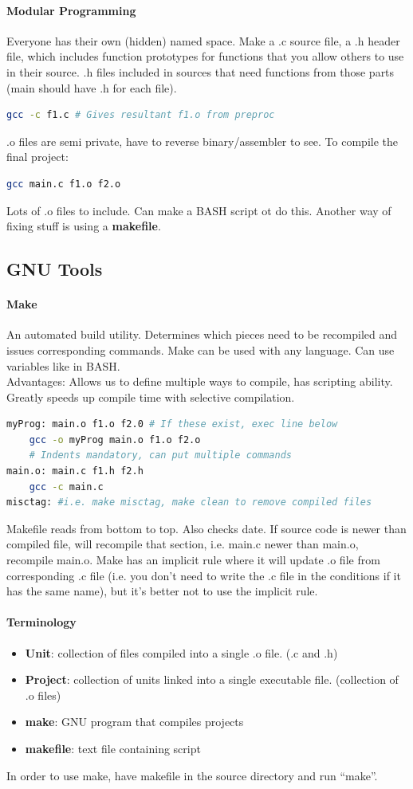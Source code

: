 \documentclass[12 pt]{article}
\begin{document}
\paragraph{Modular Programming} Everyone has their own (hidden) named space. Make a .c source file, a .h header file, which includes function prototypes for functions that you allow others to use in their source. .h files included in sources that need functions from those parts (main should have .h for each file).
\begin{lstlisting}[language=bash]
gcc -c f1.c # Gives resultant f1.o from preproc
\end{lstlisting}
.o files are semi private, have to reverse binary/assembler to see. To compile the final project:
\begin{lstlisting}[language=bash]
gcc main.c f1.o f2.o
\end{lstlisting}
Lots of .o files to include. Can make a BASH script ot do this. Another way of fixing stuff is using a \textbf{makefile}.

\subsection{GNU Tools}
\paragraph{Make} An automated build utility. Determines which pieces need to be recompiled and issues corresponding commands. Make can be used with any language. Can use variables like in BASH.
\\ Advantages: Allows us to define multiple ways to compile, has scripting ability. Greatly speeds up compile time with selective compilation. 
\begin{lstlisting}[language=bash]
myProg: main.o f1.o f2.0 # If these exist, exec line below
    gcc -o myProg main.o f1.o f2.o
    # Indents mandatory, can put multiple commands
main.o: main.c f1.h f2.h
    gcc -c main.c
misctag: #i.e. make misctag, make clean to remove compiled files
\end{lstlisting}
Makefile reads from bottom to top. Also checks date. If source code is newer than compiled file, will recompile that section, i.e. main.c newer than main.o, recompile main.o. Make has an implicit rule where it will update .o file from corresponding .c file (i.e. you don't need to write the .c file in the conditions if it has the same name), but it's better not to use the implicit rule.
\paragraph{Terminology}
\begin{itemize}
\item 
\textbf{Unit}: collection of files compiled into a single .o file. (.c and .h)
\item 
\textbf{Project}: collection of units linked into a single executable file. (collection of .o files)
\item \textbf{make}: GNU program that compiles projects
\item \textbf{makefile}: text file containing script
\end{itemize}
In order to use make, have makefile in the source directory and run ``make''.
\end{document}
